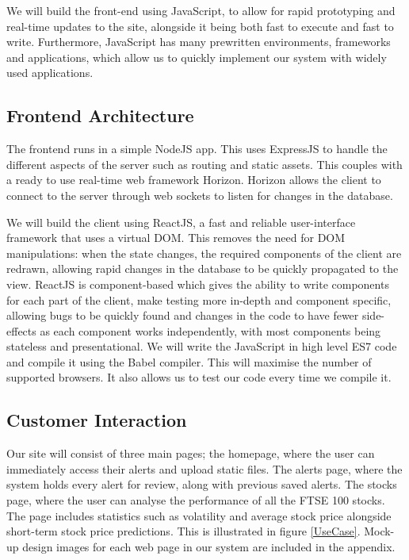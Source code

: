 \documentclass[11pt, oneside, a4paper]{article}
\begin{document}
We will build the front-end using JavaScript, to allow for rapid prototyping and
real-time updates to the site, alongside it being both fast to execute and fast
to write. Furthermore, JavaScript has many prewritten environments, frameworks
and applications, which allow us to quickly implement our system with widely used
applications.

\subsection{Frontend Architecture}
The frontend runs in a simple NodeJS app. This uses ExpressJS to handle the
different aspects of the server such as routing and static assets. This couples
with a ready to use real-time web framework Horizon. Horizon allows the client to
connect to the server through web sockets to listen for changes in the database.

We will build the client using ReactJS, a fast and reliable user-interface framework
that uses a virtual DOM. This removes the need for DOM manipulations: when the state
changes, the required components of the client are redrawn, allowing rapid changes in
the database to be quickly propagated to the view. ReactJS is component-based which
gives the ability to write components for each part of the client, make testing more
in-depth and component specific, allowing bugs to be quickly found and changes in
the code to have fewer side-effects as each component works independently, with most
components being stateless and presentational. We will write the JavaScript in high
level ES7 code and compile it using the Babel compiler. This will maximise the number
of supported browsers. It also allows us to test our code every time we compile it.

\subsection{Customer Interaction}
Our site will consist of three main pages; the homepage, where the user can immediately
access their alerts and upload static files. The alerts page, where the system holds
every alert for review, along with previous saved alerts. The stocks page, where
the user can analyse the performance of all the FTSE 100 stocks. The page includes
statistics such as volatility and average stock price alongside short-term stock
price predictions. This is illustrated in figure \ref{UseCase}. Mock-up design images
for each web page in our system are included in the appendix.
\end{document}
